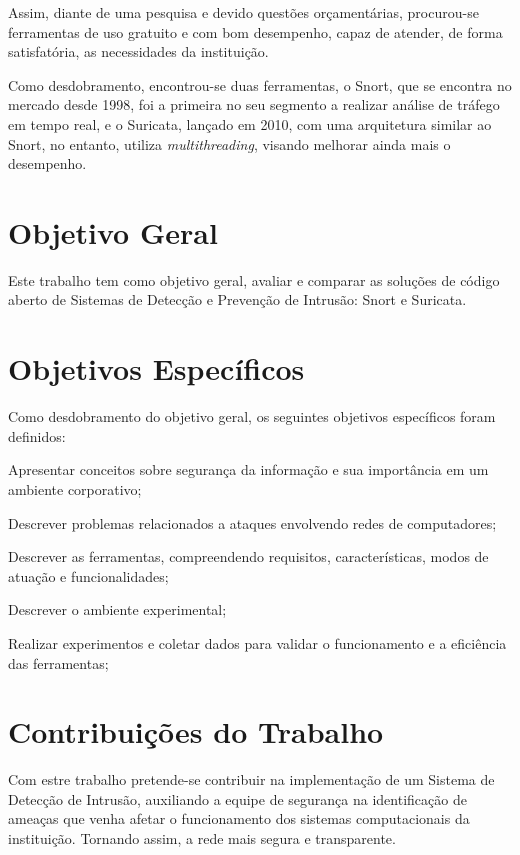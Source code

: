 Assim, diante de uma pesquisa e devido questões orçamentárias, procurou-se ferramentas de uso gratuito e com bom desempenho, capaz de atender, de forma satisfatória, as necessidades da instituição. 

Como desdobramento, encontrou-se duas ferramentas, o Snort, que se encontra no mercado desde 1998, foi a primeira no seu segmento a realizar análise de tráfego em tempo real, e o Suricata, lançado em 2010, com uma arquitetura similar ao Snort, no entanto, utiliza \textit{multithreading}, visando melhorar ainda mais o desempenho.

\section{Objetivo Geral} \label{sec:objectivo-geral}

Este trabalho tem como objetivo geral, avaliar e comparar as soluções de código aberto de Sistemas de Detecção e Prevenção de Intrusão: Snort e Suricata. 

\section{Objetivos Específicos} \label{sec:objetivos-especificos}

Como desdobramento do objetivo geral, os seguintes objetivos específicos foram definidos:

\begin{alineas}
\item Apresentar conceitos sobre segurança da informação e sua importância em um ambiente corporativo;
\item Descrever problemas relacionados a ataques envolvendo redes de computadores;
\item Descrever as ferramentas, compreendendo requisitos, características, modos de atuação e funcionalidades;
\item Descrever o ambiente experimental;
\item Realizar experimentos e coletar dados para validar o funcionamento e a eficiência das ferramentas;
\end{alineas}

\section{Contribuições do Trabalho}

Com estre trabalho pretende-se contribuir na implementação de um Sistema de Detecção de Intrusão, auxiliando a equipe de segurança na identificação de ameaças que venha afetar o funcionamento dos sistemas computacionais da instituição. Tornando assim, a rede mais segura e transparente.

